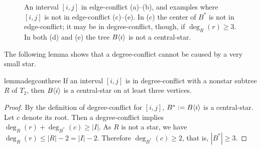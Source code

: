 \documentclass[11pt,a4paper,colorlinks=true,urlcolor=blue,citecolor=red]{article}
\theoremstyle{plain}
\begin{document}
\begin{figure}[htbp]
  \centering {}\hfil
  \hfil
  \hfil
  \hfil
  \hfil
  \caption{An interval $[i,j]$ in edge-conflict (a)--(b), and examples
    where $[i,j]$ is not in edge-conflict (c)--(e). In (c) the center of
    $B^*$ is not in edge-conflict; it may be in degree-conflict, though,
    if $\deg_R(r)\ge 3$. In both (d) and (e) the tree $B\langle{i}\rangle$ is
    not a central-star.\label{fig:starconflicts}}
\end{figure}



\noindent
The following lemma shows that a degree-conflict cannot be caused by a
very small star.
\begin{restatable}{lemma}{degconthree}\label{lem:degcon3}
  If an interval $[i,j]$ is in degree-conflict with a nonstar subtree
  $R$ of $T_2$, then $B\langle{i}\rangle$ is a central-star on at least three
  vertices.
\end{restatable}
\begin{proof}
  By the definition of degree-conflict for $[i,j]$, $B^*:=B\langle{i}\rangle$ is
  a central-star. Let $c$ denote its root.  Then a degree-conflict
  implies $\deg_R(r)+\deg_{B^*}(c)\ge|I|$. As $R$ is not a star, we have
  $\deg_R(r)\le|R|-2=|I|-2$. Therefore $\deg_{B^*}(c)\ge 2$, that is,
  $|B^*|\ge 3$.
\end{proof}
\end{document}
